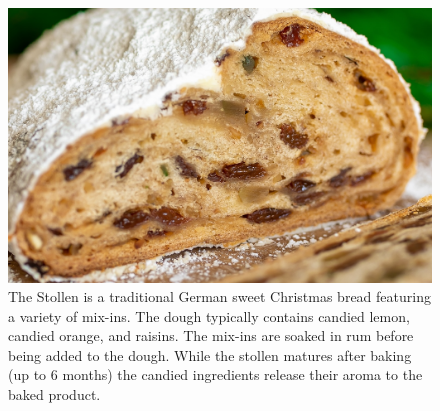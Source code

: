 \begin{figure}[htb!]
  \includegraphics[width=\textwidth]{stollen-close-up}
  \caption[Stollen closeup]{The Stollen is a traditional German sweet Christmas
    bread featuring a variety of mix-ins. The dough typically contains candied lemon,
    candied orange, and raisins. The mix-ins are soaked in rum before being added to
    the dough. While the stollen matures after baking (up to 6 months) the candied ingredients release
    their aroma to the baked product.}%
\end{figure}
